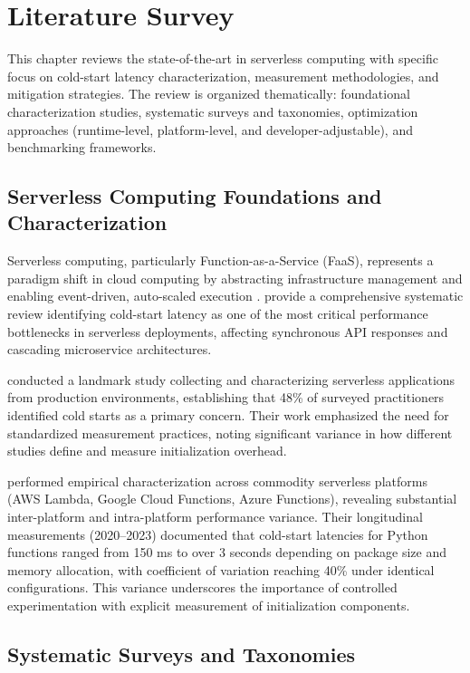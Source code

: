 \chapter{Literature Survey}
\label{ch:literature}

This chapter reviews the state-of-the-art in serverless computing with specific focus on cold-start latency characterization, measurement methodologies, and mitigation strategies. The review is organized thematically: foundational characterization studies, systematic surveys and taxonomies, optimization approaches (runtime-level, platform-level, and developer-adjustable), and benchmarking frameworks.

\section{Serverless Computing Foundations and Characterization}

Serverless computing, particularly Function-as-a-Service (FaaS), represents a paradigm shift in cloud computing by abstracting infrastructure management and enabling event-driven, auto-scaled execution \citep{shafiei2022survey}. \citet{wen2023rise} provide a comprehensive systematic review identifying cold-start latency as one of the most critical performance bottlenecks in serverless deployments, affecting synchronous API responses and cascading microservice architectures.

\citet{eismann2022state} conducted a landmark study collecting and characterizing serverless applications from production environments, establishing that 48\% of surveyed practitioners identified cold starts as a primary concern. Their work emphasized the need for standardized measurement practices, noting significant variance in how different studies define and measure initialization overhead.

\citet{wen2023characterizing} performed empirical characterization across commodity serverless platforms (AWS Lambda, Google Cloud Functions, Azure Functions), revealing substantial inter-platform and intra-platform performance variance. Their longitudinal measurements (2020–2023) documented that cold-start latencies for Python functions ranged from 150 ms to over 3 seconds depending on package size and memory allocation, with coefficient of variation reaching 40\% under identical configurations. This variance underscores the importance of controlled experimentation with explicit measurement of initialization components.

\section{Systematic Surveys and Taxonomies}

